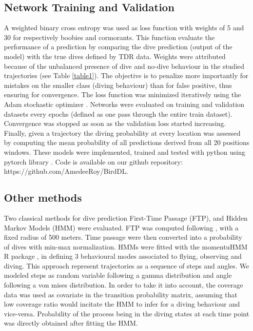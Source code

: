 \documentclass{article}
\begin{document}
\subsection{Network Training and Validation}
A weighted binary cross entropy was used as loss function with weights of 5 and 30 for respectively boobies and cormorants.
This function evaluate the performance of a prediction by comparing the dive prediction (output of the model) with the true dives defined by TDR data.
Weights were attributed because of the unbalanced presence of dive and no-dive behaviour in the studied trajectories (see Table \ref{table1}).
The objective is to penalize more importantly for mistakes on the smaller class (diving behaviour) than for false positive, thus ensuring for convergence.
The loss function was minimized iteratively using the Adam stochastic optimizer \cite{kingma_adam_2017}.
Networks were evaluated on training and validation datasets every epochs (defined as one pass through the entire train dataset). Convergence was stopped as soon as the validation loss started increasing.
Finally, given a trajectory the diving probability at every location was assessed by computing the mean probability of all predictions derived from all 20 positions windows.
These models were implemented, trained and tested with python using pytorch library \cite{_pytorch/pytorch_2021}. Code is available on our github repository: https://github.com/AmedeeRoy/BirdDL.

\subsection{Other methods}
Two classical methods for dive prediction First-Time Passage (FTP), and Hidden Markov Models (HMM) were evaluated.
FTP was computed following \cite{fauchald_using_2003}, with a fixed radius of 500 meters. Time passage were then converted into a probability of dives with min-max normalization.
HMMs were fitted with the momentuHMM R package \cite{mcclintock_momentuhmm_2018}, in defining 3 behavioural modes associated to flying, observing and diving. This approach represent trajectories as a sequence of steps and angles. We modeled steps as random variable following a gamma distribution and angle following a von mises distribution.
In order to take it into account, the coverage data was used as covariate in the transition probability matrix, assuming that low coverage ratio would incitate the HMM to infer for a diving behaviour and vice-versa.
Probability of the process being in the diving states at each time point was directly obtained after fitting the HMM.
\end{document}
